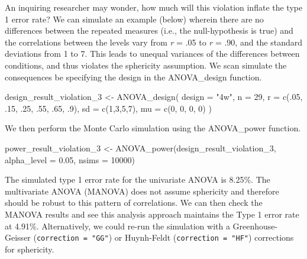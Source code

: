 \documentclass[
]{book}
\newenvironment{Shaded}{\begin{snugshade}}{\end{snugshade}}
\newcommand{\AttributeTok}[1]{\textcolor[rgb]{0.77,0.63,0.00}{#1}}
\newcommand{\DecValTok}[1]{\textcolor[rgb]{0.00,0.00,0.81}{#1}}
\newcommand{\FloatTok}[1]{\textcolor[rgb]{0.00,0.00,0.81}{#1}}
\newcommand{\FunctionTok}[1]{\textcolor[rgb]{0.00,0.00,0.00}{#1}}
\newcommand{\NormalTok}[1]{#1}
\newcommand{\OtherTok}[1]{\textcolor[rgb]{0.56,0.35,0.01}{#1}}
\newcommand{\StringTok}[1]{\textcolor[rgb]{0.31,0.60,0.02}{#1}}
\begin{document}
An inquiring researcher may wonder, how much will this violation inflate the type 1 error rate?
We can simulate an example (below) wherein there are no differences between the repeated measures (i.e., the null-hypothesis is true) and the correlations between the levels vary from \emph{r} = .05 to \emph{r} = .90, and the standard deviations from 1 to 7.
This leads to unequal variances of the differences between conditions, and thus violates the sphericity assumption.
We scan simulate the consequences be specifying the design in the ANOVA\_design function.

\begin{Shaded}
\begin{Highlighting}[]
\NormalTok{design\_result\_violation\_3 }\OtherTok{\textless{}{-}} \FunctionTok{ANOVA\_design}\NormalTok{(}
  \AttributeTok{design =} \StringTok{"4w"}\NormalTok{,}
  \AttributeTok{n =} \DecValTok{29}\NormalTok{,}
  \AttributeTok{r =} \FunctionTok{c}\NormalTok{(.}\DecValTok{05}\NormalTok{, .}\DecValTok{15}\NormalTok{, .}\DecValTok{25}\NormalTok{, .}\DecValTok{55}\NormalTok{, .}\DecValTok{65}\NormalTok{, .}\DecValTok{9}\NormalTok{),}
  \AttributeTok{sd =} \FunctionTok{c}\NormalTok{(}\DecValTok{1}\NormalTok{,}\DecValTok{3}\NormalTok{,}\DecValTok{5}\NormalTok{,}\DecValTok{7}\NormalTok{),}
  \AttributeTok{mu =} \FunctionTok{c}\NormalTok{(}\DecValTok{0}\NormalTok{, }\DecValTok{0}\NormalTok{, }\DecValTok{0}\NormalTok{, }\DecValTok{0}\NormalTok{)}
\NormalTok{)}
\end{Highlighting}
\end{Shaded}

We then perform the Monte Carlo simulation using the ANOVA\_power function.

\begin{Shaded}
\begin{Highlighting}[]
\NormalTok{power\_result\_violation\_3 }\OtherTok{\textless{}{-}} \FunctionTok{ANOVA\_power}\NormalTok{(design\_result\_violation\_3, }
                                        \AttributeTok{alpha\_level =} \FloatTok{0.05}\NormalTok{, }
                                        \AttributeTok{nsims =} \DecValTok{10000}\NormalTok{)}
\end{Highlighting}
\end{Shaded}

The simulated type 1 error rate for the univariate ANOVA is 8.25\%.
The multivariate ANOVA (MANOVA) does not assume sphericity and therefore should be robust to this pattern of correlations.
We can then check the MANOVA results and see this analysis approach maintains the Type 1 error rate at 4.91\%. Alternatively, we could re-run the simulation with a Greenhouse-Geisser (\texttt{correction\ =\ "GG"}) or Huynh-Feldt (\texttt{correction\ =\ "HF"}) corrections for sphericity.
\end{document}
